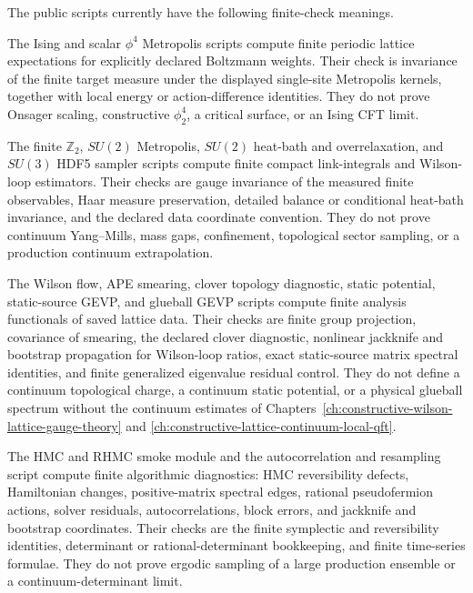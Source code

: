 The public scripts currently have the following finite-check meanings.
\begin{description}[leftmargin=2em,labelindent=0pt,labelsep=0.5em,style=nextline]
\item[Spin and scalar Metropolis.]
The Ising and scalar \(\phi^4\) Metropolis scripts compute finite periodic
lattice expectations for explicitly declared Boltzmann weights.  Their
check is invariance of the finite target measure under the displayed
single-site Metropolis kernels, together with local energy or
action-difference identities.  They do not prove Onsager scaling,
constructive \(\phi^4_2\), a critical surface, or an Ising CFT limit.

\item[Compact gauge samplers.]
The finite \(\mathbb Z_2\), \(SU(2)\) Metropolis, \(SU(2)\)
heat-bath and overrelaxation, and \(SU(3)\) HDF5 sampler scripts compute finite
compact link-integrals and Wilson-loop estimators.  Their checks are
gauge invariance of the measured finite observables, Haar measure
preservation, detailed balance or conditional heat-bath invariance, and the
declared data coordinate convention.  They do not prove continuum
Yang--Mills, mass gaps, confinement, topological sector sampling, or a
production continuum extrapolation.

\item[Flow, smearing, topology, and static-potential analysis.]
The Wilson flow, APE smearing, clover topology diagnostic,
static potential, static-source GEVP, and glueball GEVP scripts compute finite analysis
functionals of saved lattice data.  Their checks are finite group
projection, covariance of smearing, the declared clover diagnostic, nonlinear
jackknife and bootstrap propagation for Wilson-loop ratios, exact
static-source matrix spectral identities, and finite generalized eigenvalue
residual control.  They do not define a continuum
topological charge, a continuum static potential, or a physical glueball
spectrum without the continuum estimates of
Chapters~\ref{ch:constructive-wilson-lattice-gauge-theory} and
\ref{ch:constructive-lattice-continuum-local-qft}.

\item[HMC, RHMC, and Markov-chain error analysis.]
The HMC and RHMC smoke module and the autocorrelation and resampling script compute
finite algorithmic diagnostics: HMC reversibility defects, Hamiltonian
changes, positive-matrix spectral edges, rational pseudofermion actions,
solver residuals, autocorrelations, block errors, and jackknife and bootstrap
coordinates.  Their checks are the finite symplectic and reversibility
identities, determinant or rational-determinant bookkeeping, and finite
time-series formulae.  They do not prove ergodic sampling of a large
production ensemble or a continuum-determinant limit.


\end{description}
